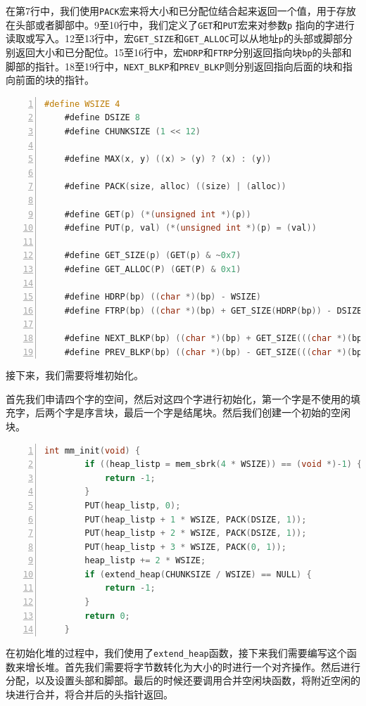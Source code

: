 \documentclass{article}
\begin{document}
在第7行中，我们使用\texttt{PACK}宏来将大小和已分配位结合起来返回一个值，用于存放在头部或者脚部中。9至10行中，我们定义了\texttt{GET}和\texttt{PUT}宏来对参数\texttt{p} 指向的字进行读取或写入。12至13行中，宏\texttt{GET\_SIZE}和\texttt{GET\_ALLOC}可以从地址\texttt{p}的头部或脚部分别返回大小和已分配位。15至16行中，宏\texttt{HDRP}和\texttt{FTRP}分别返回指向块\texttt{bp}的头部和脚部的指针。18至19行中，\texttt{NEXT\_BLKP}和\texttt{PREV\_BLKP}则分别返回指向后面的块和指向前面的块的指针。
\begin{lstlisting}[xleftmargin = 4em,xrightmargin = 4em, aboveskip = 1em, numbers = left, language = C]
    #define WSIZE 4
    #define DSIZE 8
    #define CHUNKSIZE (1 << 12)
    
    #define MAX(x, y) ((x) > (y) ? (x) : (y))
    
    #define PACK(size, alloc) ((size) | (alloc))
    
    #define GET(p) (*(unsigned int *)(p))
    #define PUT(p, val) (*(unsigned int *)(p) = (val))
    
    #define GET_SIZE(p) (GET(p) & ~0x7)
    #define GET_ALLOC(P) (GET(P) & 0x1)
    
    #define HDRP(bp) ((char *)(bp) - WSIZE)
    #define FTRP(bp) ((char *)(bp) + GET_SIZE(HDRP(bp)) - DSIZE)
    
    #define NEXT_BLKP(bp) ((char *)(bp) + GET_SIZE(((char *)(bp) - WSIZE)))
    #define PREV_BLKP(bp) ((char *)(bp) - GET_SIZE(((char *)(bp) - DSIZE)))
\end{lstlisting}

接下来，我们需要将堆初始化。

首先我们申请四个字的空间，然后对这四个字进行初始化，第一个字是不使用的填充字，后两个字是序言块，最后一个字是结尾块。然后我们创建一个初始的空闲块。

\begin{lstlisting}[xleftmargin = 4em,xrightmargin = 4em, aboveskip = 1em, numbers = left, language = C]
    int mm_init(void) {
        if ((heap_listp = mem_sbrk(4 * WSIZE)) == (void *)-1) {
            return -1;
        }
        PUT(heap_listp, 0);
        PUT(heap_listp + 1 * WSIZE, PACK(DSIZE, 1));
        PUT(heap_listp + 2 * WSIZE, PACK(DSIZE, 1));
        PUT(heap_listp + 3 * WSIZE, PACK(0, 1));
        heap_listp += 2 * WSIZE;
        if (extend_heap(CHUNKSIZE / WSIZE) == NULL) {
            return -1;
        }
        return 0;
    }
\end{lstlisting}

在初始化堆的过程中，我们使用了\texttt{extend\_heap}函数，接下来我们需要编写这个函数来增长堆。首先我们需要将字节数转化为大小的时进行一个对齐操作。然后进行分配，以及设置头部和脚部。最后的时候还要调用合并空闲块函数，将附近空闲的块进行合并，将合并后的头指针返回。
\end{document}
